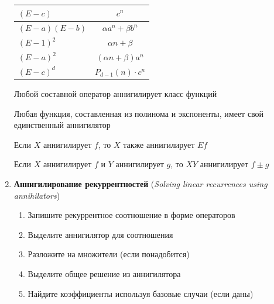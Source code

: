 \documentclass[12pt]{article}
\begin{document}
\begin{enumerate}
\begin{tabular}{lc}
            \hline

            $(E - c)$ & $c^n$ \\

            \hline

            $(E - a)(E - b)$ & $\alpha a^n + \beta b^n$ \\

            \hline

            $(E - 1)^2$ & $\alpha n + \beta$ \\

            \hline

            $(E - a)^2$ & $(\alpha n + \beta) a^n$ \\

            \hline

            $(E - c)^d$ & $P_{d - 1}(n) \cdot c^n$ \\

            \hline

        \end{tabular}

        \Notas Любой составной оператор аннигилирует класс функций

        \Notas Любая функция, составленная из полинома и экспоненты, имеет свой единственный аннигилятор

        Если $X$ аннигилирует $f$, то $X$ также аннигилирует $Ef$

        Если $X$ аннигилирует $f$ и $Y$ аннигилирует $g$, то $XY$ аннигилирует $f \pm g$


        \item \textbf{Аннигилирование рекуррентностей} (\textit{Solving linear recurrences using annihilators})

        \begin{enumerate}
            \item Запишите рекуррентное соотношение в форме операторов

            \item Выделите аннигилятор для соотношения

            \item Разложите на множители (если понадобится)

            \item Выделите общее решение из аннигилятора

            \item Найдите коэффициенты используя базовые случаи (если даны)
        \end{enumerate}


\end{enumerate}
\end{document}
